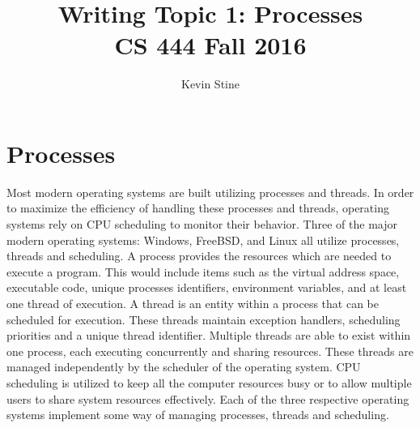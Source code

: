 \documentclass[letterpaper,10pt,draftclsnofoot,onecolumn,titlepage]{IEEEtran}
\def\name{Kevin Stine}
\begin{document}
	\title{\huge Writing Topic 1: Processes\\CS 444 Fall 2016}
	\author{\large \name}
	\maketitle
	\newpage
	\section*{Processes}
		Most modern operating systems are built utilizing processes and threads. In order to maximize the efficiency of handling these processes and threads, operating systems rely on CPU scheduling to monitor their behavior. Three of the major modern operating systems: Windows, FreeBSD, and Linux all utilize processes, threads and scheduling. A process provides the resources which are needed to execute a program. This would include items such as the virtual address space, executable code, unique processes identifiers, environment variables, and at least one thread of execution. A thread is an entity within a process that can be scheduled for execution. These threads maintain exception handlers, scheduling priorities and a unique thread identifier. Multiple threads are able to exist within one process, each executing concurrently and sharing resources. These threads are managed independently by the scheduler of the operating system. CPU scheduling is utilized to keep all the computer resources busy or to allow multiple users to share system resources effectively. Each of the three respective operating systems implement some way of managing processes, threads and scheduling.
		\par
\end{document}
